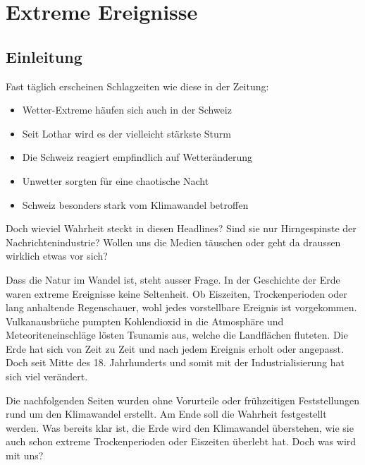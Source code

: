%
%
%
\chapter{Extreme Ereignisse\label{chapter:thema}}
\begin{refsection}


\section{Einleitung}
Fast täglich erscheinen Schlagzeiten wie diese in der Zeitung:

\begin{itemize}
\item Wetter-Extreme häufen sich auch in der Schweiz
\item Seit Lothar wird es der vielleicht stärkste Sturm
\item Die Schweiz reagiert empfindlich auf Wetteränderung
\item Unwetter sorgten für eine chaotische Nacht
\item Schweiz besonders stark vom Klimawandel betroffen
\end{itemize}

Doch wieviel Wahrheit steckt in diesen Headlines? Sind sie nur Hirngespinste der Nachrichtenindustrie? Wollen uns die Medien täuschen oder geht da draussen wirklich etwas vor sich?

Dass die Natur im Wandel ist, steht ausser Frage. In der Geschichte der Erde waren extreme Ereignisse keine Seltenheit. Ob Eiszeiten, Trockenperioden oder lang anhaltende Regenschauer, wohl jedes vorstellbare Ereignis ist vorgekommen. Vulkanausbrüche pumpten Kohlendioxid in die Atmosphäre und Meteoriteneinschläge lösten Tsunamis aus, welche die Landflächen fluteten. Die Erde hat sich von Zeit zu Zeit und nach jedem Ereignis erholt oder angepasst. Doch seit Mitte des 18. Jahrhunderts und somit mit der Industrialisierung hat sich viel verändert.

Die nachfolgenden Seiten wurden ohne Vorurteile oder frühzeitigen Feststellungen rund um den Klimawandel erstellt. Am Ende soll die Wahrheit festgestellt werden.
Was bereits klar ist, die Erde wird den Klimawandel überstehen, wie sie auch schon extreme Trockenperioden oder Eiszeiten überlebt hat. Doch was wird mit uns?



\end{refsection}
